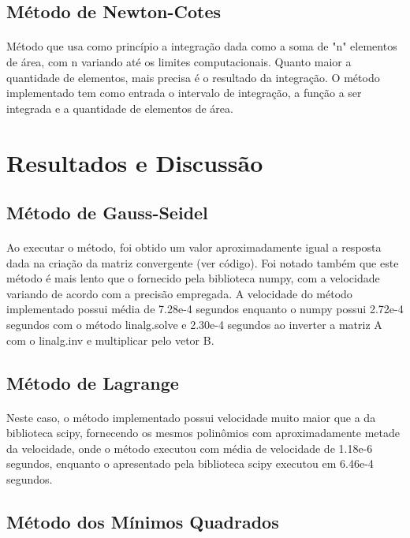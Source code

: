 \documentclass{article}
\begin{document}
\subsection{Método de Newton-Cotes}
\paragraph{}Método que usa como princípio a integração dada como a soma de "n" elementos de área, com n variando até os limites computacionais. Quanto maior a quantidade de elementos, mais precisa é o resultado da integração. O método implementado tem como entrada o intervalo de integração, a função a ser integrada e a quantidade de elementos de área.

\section{Resultados e Discussão}
\subsection{Método de Gauss-Seidel}
\paragraph{}Ao executar o método, foi obtido um valor aproximadamente igual a resposta dada na criação da matriz convergente (ver código). Foi notado também que este método é mais lento que o fornecido pela biblioteca numpy, com a velocidade variando de acordo com a precisão empregada. A velocidade do método implementado possui média de 7.28e-4 segundos enquanto o numpy possui 2.72e-4 segundos com o método linalg.solve e 2.30e-4 segundos ao inverter a matriz A com o linalg.inv e multiplicar pelo vetor B.

\subsection{Método de Lagrange}
\paragraph{}Neste caso, o método implementado possui velocidade muito maior que a da biblioteca scipy, fornecendo os mesmos polinômios com aproximadamente metade da velocidade, onde o método executou com média de velocidade de 1.18e-6 segundos, enquanto o apresentado pela biblioteca scipy  executou em 6.46e-4 segundos.

\subsection{Método dos Mínimos Quadrados}
\end{document}
